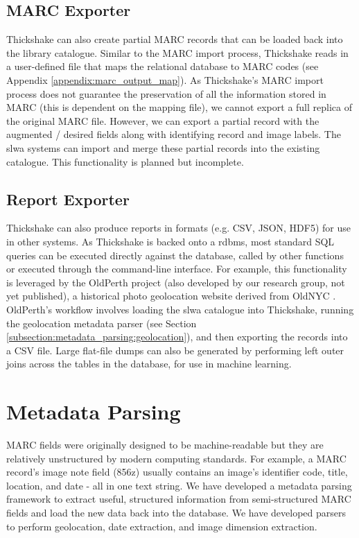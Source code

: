 \documentclass[10pt, a4paper]{article}
\begin{document}
\subsection{MARC Exporter}
\label{subsection:library_interface:marc_exporter}
Thickshake can also create partial MARC records that can be loaded back into the library catalogue. Similar to the MARC import process, Thickshake reads in a user-defined file that maps the relational database to MARC codes (see Appendix \ref{appendix:marc_output_map}). As Thickshake's MARC import process does not guarantee the preservation of all the information stored in MARC (this is dependent on the mapping file), we cannot export a full replica of the original MARC file. However, we can export a partial record with the augmented / desired fields along with identifying record and image labels. The \Gls{slwa} systems can import and merge these partial records into the existing catalogue. This functionality is planned but incomplete.

\subsection{Report Exporter}
\label{subsection:library_interface:report_exporter}
Thickshake can also produce reports in formats (e.g. CSV, JSON, HDF5) for use in other systems. As Thickshake is backed onto a \Gls{rdbms}, most standard SQL queries can be executed directly against the database, called by other functions or executed through the command-line interface. For example, this functionality is leveraged by the OldPerth project (also developed by our research group, not yet published), a historical photo geolocation website derived from OldNYC \cite{oldnyc}. OldPerth's workflow involves loading the \Gls{slwa} catalogue into Thickshake, running the geolocation metadata parser (see Section \ref{subsection:metadata_parsing:geolocation}), and then exporting the records into a CSV file. Large flat-file dumps can also be generated by performing left outer joins across the tables in the database, for use in machine learning.

\section{Metadata Parsing}
\label{section:metadata_parsing}

\label{subsection:metadata_parsing:introduction}
MARC fields were originally designed to be machine-readable but they are relatively unstructured by modern computing standards. For example, a MARC record's image note field (856z) usually contains an image's identifier code, title, location, and date - all in one text string. We have developed a metadata parsing framework to extract useful, structured information from semi-structured MARC fields and load the new data back into the database. We have developed parsers to perform geolocation, date extraction, and image dimension extraction.
\end{document}
